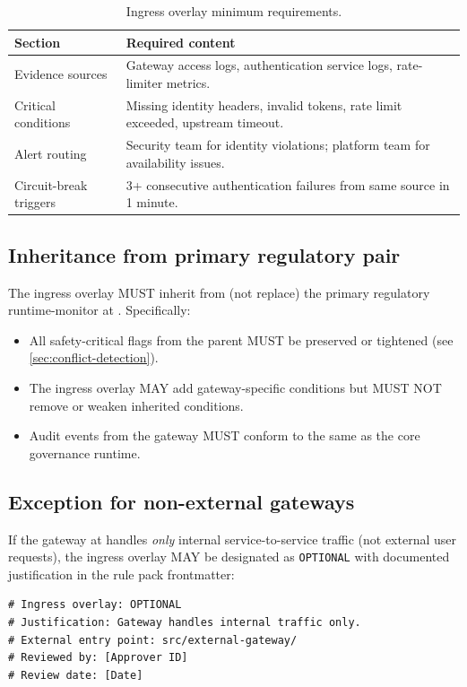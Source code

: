 \begin{table}[htbp]
\centering
\footnotesize
\caption{Ingress overlay minimum requirements.}
\label{tab:ingress-requirements}
\begin{tabularx}{\textwidth}{@{}l X@{}}
\toprule
\textbf{Section} & \textbf{Required content} \\
\midrule
Evidence sources & Gateway access logs, authentication service logs, rate-limiter metrics. \\
Critical conditions & Missing identity headers, invalid tokens, rate limit exceeded, upstream timeout. \\
Alert routing & Security team for identity violations; platform team for availability issues. \\
Circuit-break triggers & 3+ consecutive authentication failures from same source in 1 minute. \\
\bottomrule
\end{tabularx}
\end{table}

\subsection{Inheritance from primary regulatory pair}

The ingress overlay MUST inherit from (not replace) the primary
regulatory runtime-monitor at
. Specifically:
\begin{itemize}
  \item All safety-critical flags from the parent MUST be preserved or
    tightened (see \cref{sec:conflict-detection}).
  \item The ingress overlay MAY add gateway-specific conditions but
    MUST NOT remove or weaken inherited conditions.
  \item Audit events from the gateway MUST conform to the same
     as the
    core governance runtime.
\end{itemize}

\subsection{Exception for non-external gateways}

If the gateway at  handles
\emph{only} internal service-to-service traffic (not external user
requests), the ingress overlay MAY be designated as \texttt{OPTIONAL}
with documented justification in the rule pack frontmatter:
\begin{verbatim}
# Ingress overlay: OPTIONAL
# Justification: Gateway handles internal traffic only.
# External entry point: src/external-gateway/
# Reviewed by: [Approver ID]
# Review date: [Date]
\end{verbatim}
